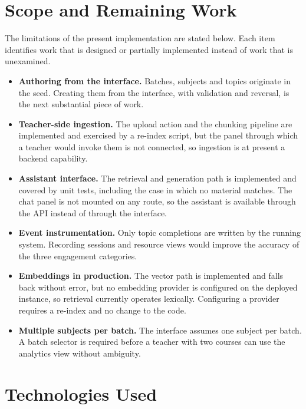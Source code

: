 \section{Scope and Remaining Work}

The limitations of the present implementation are stated below. Each item identifies work that is designed or partially implemented instead of work that is unexamined.

\begin{itemize}
    \item \textbf{Authoring from the interface.} Batches, subjects and topics originate in the seed. Creating them from the interface, with validation and reversal, is the next substantial piece of work.
    \item \textbf{Teacher-side ingestion.} The upload action and the chunking pipeline are implemented and exercised by a re-index script, but the panel through which a teacher would invoke them is not connected, so ingestion is at present a backend capability.
    \item \textbf{Assistant interface.} The retrieval and generation path is implemented and covered by unit tests, including the case in which no material matches. The chat panel is not mounted on any route, so the assistant is available through the API instead of through the interface.
    \item \textbf{Event instrumentation.} Only topic completions are written by the running system. Recording sessions and resource views would improve the accuracy of the three engagement categories.
    \item \textbf{Embeddings in production.} The vector path is implemented and falls back without error, but no embedding provider is configured on the deployed instance, so retrieval currently operates lexically. Configuring a provider requires a re-index and no change to the code.
    \item \textbf{Multiple subjects per batch.} The interface assumes one subject per batch. A batch selector is required before a teacher with two courses can use the analytics view without ambiguity.
\end{itemize}

\section{Technologies Used}





